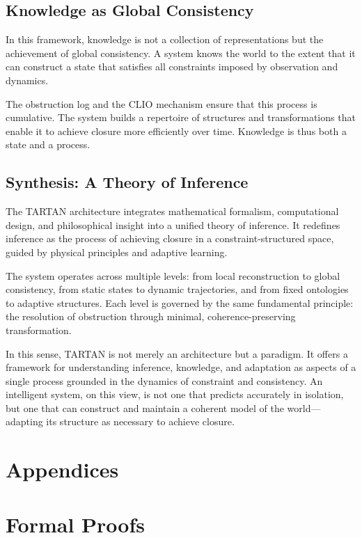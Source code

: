 \documentclass[12pt, oneside]{article}
\begin{document}
\subsection{Knowledge as Global Consistency}

In this framework, knowledge is not a collection of representations but the achievement of global consistency. A system knows the world to the extent that it can construct a state that satisfies all constraints imposed by observation and dynamics.

The obstruction log and the CLIO mechanism ensure that this process is cumulative. The system builds a repertoire of structures and transformations that enable it to achieve closure more efficiently over time. Knowledge is thus both a state and a process.

\subsection{Synthesis: A Theory of Inference}

The TARTAN architecture integrates mathematical formalism, computational design, and philosophical insight into a unified theory of inference. It redefines inference as the process of achieving closure in a constraint-structured space, guided by physical principles and adaptive learning.

The system operates across multiple levels: from local reconstruction to global consistency, from static states to dynamic trajectories, and from fixed ontologies to adaptive structures. Each level is governed by the same fundamental principle: the resolution of obstruction through minimal, coherence-preserving transformation.

In this sense, TARTAN is not merely an architecture but a paradigm. It offers a framework for understanding inference, knowledge, and adaptation as aspects of a single process grounded in the dynamics of constraint and consistency. An intelligent system, on this view, is not one that predicts accurately in isolation, but one that can construct and maintain a coherent model of the world---adapting its structure as necessary to achieve closure.



\newpage
\section*{Appendices}

\appendix

\section{Formal Proofs}
\end{document}
